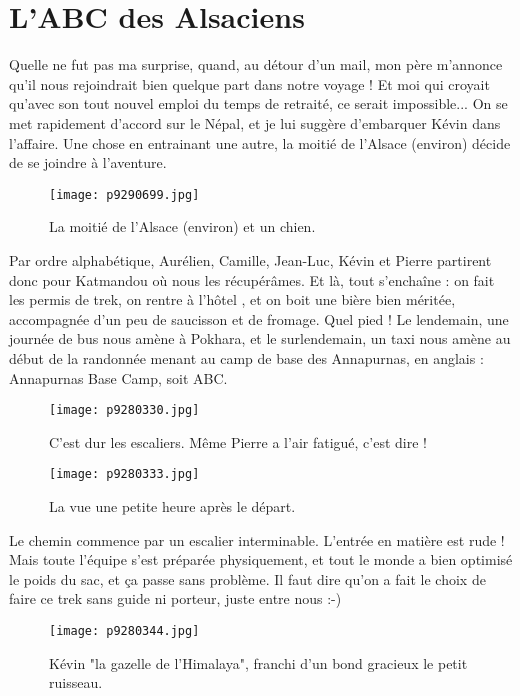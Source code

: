 \documentclass{book}
\begin{document}
\chapter{L'ABC des Alsaciens}
Quelle ne fut pas ma surprise, quand, au détour d'un mail, mon père m'annonce qu'il nous rejoindrait bien quelque part dans notre voyage ! Et moi qui croyait qu'avec son tout nouvel emploi du temps de retraité, ce serait impossible... On se met rapidement d'accord sur le Népal, et je lui suggère d'embarquer Kévin dans l'affaire. Une chose en entrainant une autre, la moitié de l'Alsace (environ) décide de se joindre à l'aventure.


\begin{figure}[h]
\centering
\texttt{[image: p9290699.jpg]}
\caption*{La moitié de l'Alsace (environ) et un chien.}
\end{figure}

Par ordre alphabétique, Aurélien, Camille, Jean-Luc, Kévin et Pierre partirent donc pour Katmandou où nous les récupérâmes. Et là, tout s'enchaîne : on fait les permis de trek, on rentre à l'hôtel , et on boit une bière bien méritée, accompagnée d'un peu de saucisson et de fromage. Quel pied ! Le lendemain, une journée de bus nous amène à Pokhara, et le surlendemain, un taxi nous amène au début de la randonnée menant au camp de base des Annapurnas, en anglais : Annapurnas Base Camp, soit ABC.


\begin{figure}[h]
\centering
\texttt{[image: p9280330.jpg]}
\caption*{C'est dur les escaliers. Même Pierre a l'air fatigué, c'est dire !}
\end{figure}


\begin{figure}[h]
\centering
\texttt{[image: p9280333.jpg]}
\caption*{La vue une petite heure après le départ.}
\end{figure}

Le chemin commence par un escalier interminable. L'entrée en matière est rude ! Mais toute l'équipe s'est préparée physiquement, et tout le monde a bien optimisé le poids du sac, et ça passe sans problème. Il faut dire qu'on a fait le choix de faire ce trek sans guide ni porteur, juste entre nous :-)


\begin{figure}[h]
\centering
\texttt{[image: p9280344.jpg]}
\caption*{Kévin "la gazelle de l'Himalaya", franchi d'un bond gracieux le petit ruisseau.}
\end{figure}
\end{document}
